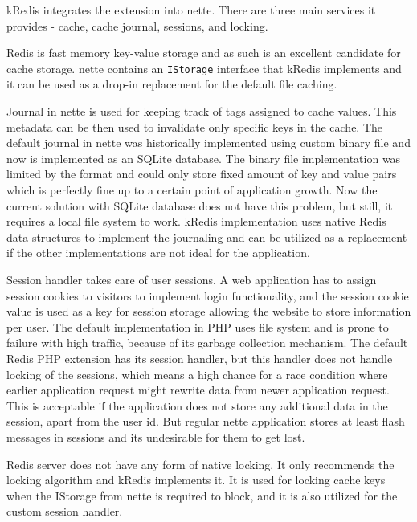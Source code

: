  \label{sec:state:redis}

\gls{kRedis} integrates the  extension  into \gls{nette}. There are three main services it provides - cache, cache journal, sessions, and locking.

Redis is fast memory key-value storage and as such is an excellent candidate for cache storage. \gls{nette} contains an \lstinline{IStorage} interface that \gls{kRedis} implements and it can be used as a drop-in replacement for the default file caching.

Journal in \gls{nette} is used for keeping track of tags assigned to cache values. This metadata can be then used to invalidate only specific keys in the cache. The default journal in \gls{nette} was historically implemented using custom binary file and now is implemented as an SQLite database. The binary file implementation was limited by the format and could only store fixed amount of key and value pairs which is perfectly fine up to a certain point of application growth. Now the current solution with SQLite database does not have this problem, but still, it requires a local file system to work. \gls{kRedis} implementation uses native Redis data structures to implement the journaling and can be utilized as a replacement if the other implementations are not ideal for the application.

Session handler takes care of user sessions. A web application has to assign session cookies to visitors to implement login functionality, and the session cookie value is used as a key for session storage allowing the website to store information per user. The default implementation in PHP uses file system and is prone to failure with high traffic, because of its garbage collection mechanism. The default Redis PHP extension has its session handler, but this handler does not handle locking of the sessions, which means a high chance for a race condition where earlier application request might rewrite data from newer application request. This is acceptable if the application does not store any additional data in the session, apart from the user id. But regular \gls{nette} application stores at least flash messages in sessions and its undesirable for them to get lost.

Redis server does not have any form of native locking. It only recommends the locking algorithm  and \gls{kRedis} implements it.
It is used for locking cache keys when the IStorage from \gls{nette} is required to block, and it is also utilized for the custom session handler.

